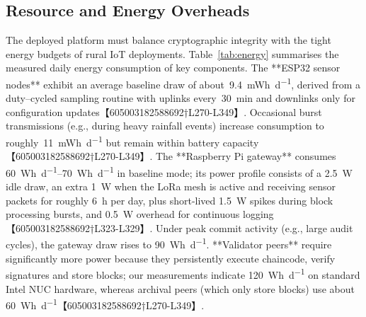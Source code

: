 \documentclass[12pt,onecolumn]{IEEEtran} %
\begin{document}


\subsection{Resource and Energy Overheads}
\label{sec:energy_overheads}

The deployed platform must balance cryptographic integrity with the tight energy budgets of rural IoT deployments.  Table~\ref{tab:energy} summarises the measured daily energy consumption of key components.  The **ESP32 sensor nodes** exhibit an average baseline draw of about~\SI{9.4}{mWh\per\day}, derived from a duty–cycled sampling routine with uplinks every\ \SI{30}{min} and downlinks only for configuration updates【605003182588692†L270-L349】.  Occasional burst transmissions (e.g., during heavy rainfall events) increase consumption to roughly~\SI{11}{mWh\per\day} but remain within battery capacity【605003182588692†L270-L349】.  The **Raspberry Pi gateway** consumes \SIrange{60}{70}{Wh\per\day} in baseline mode; its power profile consists of a \SI{2.5}{W} idle draw, an extra \SI{1}{W} when the LoRa mesh is active and receiving sensor packets for roughly \SI{6}{h} per day, plus short-lived \SI{1.5}{W} spikes during block processing bursts, and \SI{0.5}{W} overhead for continuous logging【605003182588692†L323-L329】.  Under peak commit activity (e.g., large audit cycles), the gateway draw rises to \SI{90}{Wh\per\day}.  **Validator peers** require significantly more power because they persistently execute chaincode, verify signatures and store blocks; our measurements indicate \SI{120}{Wh\per\day} on standard Intel NUC hardware, whereas archival peers (which only store blocks) use about \SI{60}{Wh\per\day}【605003182588692†L270-L349】.
\end{document}
